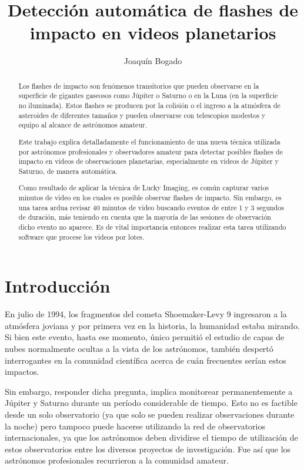 \documentclass[a4paper,10pt]{article}
\title{Detección automática de flashes de impacto en videos planetarios}
\author{Joaquín Bogado}
\begin{document}
\maketitle

\begin{abstract}
Los flashes de impacto son fenómenos transitorios que pueden observarse en la superficie 
de gigantes gaseosos como Júpiter o Saturno o en la Luna (en la superficie no iluminada). 
Estos flashes se producen por la colisión o el ingreso a la atmósfera de asteroides de 
diferentes tamaños y pueden observarse con telescopios modestos y equipo al alcance de 
astrónomos amateur.

Este trabajo explica detalladamente el funcionamiento de una nueva técnica utilizada por 
astrónomos profesionales y observadores amateur para detectar posibles flashes de impacto 
en videos de observaciones planetarias, especialmente en videos de Júpiter y Saturno, de 
manera automática.

Como resultado de aplicar la técnica de Lucky Imaging, es común capturar varios 
minutos de video en los cuales es posible observar flashes de impacto. Sin embargo, es una 
tarea ardua revisar 40 minutos de video buscando eventos de entre 1 y 3 segundos de 
duración, más teniendo en cuenta que la mayoría de las sesiones de observación dicho 
evento no aparece. Es de vital importancia entonces realizar esta tarea utilizando 
software que procese los videos por lotes.

\end{abstract}

\section{Introducción}
En julio de 1994, los fragmentos del cometa Shoemaker-Levy 9 ingresaron a la atmósfera 
joviana y por primera vez en la historia, la humanidad estaba mirando. Si bien este 
evento, hasta ese momento, único permitió el estudio de capas de nubes normalmente 
ocultas a la vista de los astrónomos, también despertó interrogantes en la comunidad 
científica acerca de cuán frecuentes serían estos impactos.

Sin embargo, responder dicha pregunta, implica monitorear permanentemente a Júpiter y 
Saturno durante un período considerable de tiempo. Esto no es factible desde un solo 
observatorio (ya que solo se pueden realizar observaciones durante la noche) pero tampoco 
puede hacerse utilizando la red de observatorios internacionales, ya que los astrónomos 
deben dividirse el tiempo de utilización de estos observatorios entre los diversos 
proyectos de investigación. Fue así que los astrónomos profesionales recurrieron a la 
comunidad amateur.
\end{document}
